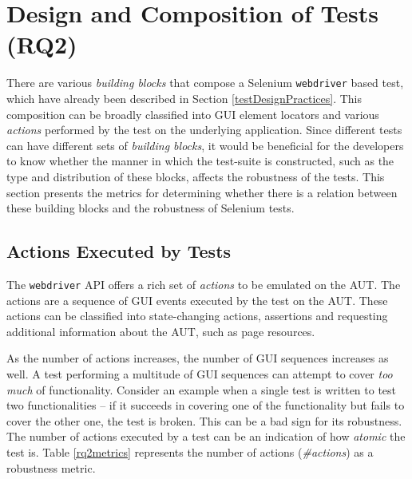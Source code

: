 \section{Design and Composition of Tests (RQ2)}
\label{robfactors}
There are various \textit{building blocks} that compose a Selenium \texttt{webdriver} based test, which have already been described in Section \ref{testDesignPractices}. This composition can be broadly classified into GUI element locators and various \textit{actions} performed by the test on the underlying application. Since different tests can have different sets of \textit{building blocks}, it would be beneficial for the developers to know whether the manner in which the test-suite is constructed, such as the type and distribution of these blocks, affects the robustness of the tests. This section presents the metrics for determining whether there is a relation between these building blocks and the robustness of Selenium tests.  

\subsection{Actions Executed by Tests}
\label{test-actions}
The \texttt{webdriver} API offers a rich set of \textit{actions} to be emulated on the AUT. The actions are a sequence of GUI events executed by the test on the AUT. These actions can be classified into state-changing actions, assertions and requesting additional information about the AUT, such as page resources. 

As the number of actions increases, the number of GUI sequences increases as well. A test performing a multitude of GUI sequences can attempt to cover \textit{too much} of functionality. Consider an example when a single test is written to test two functionalities -- if it succeeds in covering one of the functionality but fails to cover the other one, the test is broken. This can be a bad sign for its robustness. 
The number of actions executed by a test can be an indication of how \textit{atomic} the test is. Table \ref{rq2metrics} represents the number of actions (\textit{\#actions}) as a robustness metric. 


